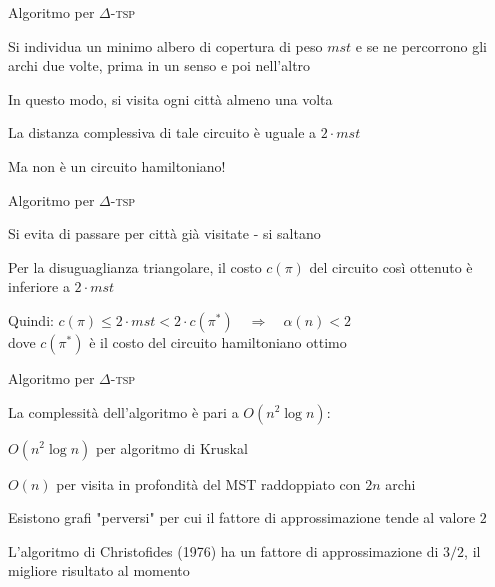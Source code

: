 \begin{frame}{Algoritmo per $\Delta$-\textsc{tsp}}

\vspace{-9pt}
\BIL
\item Si individua un minimo albero di copertura di peso $\mathit{mst}$ e se ne percorrono gli archi due volte, prima in un senso e poi nell'altro 
\item In questo modo, si visita ogni città almeno una volta
\item La distanza complessiva di tale circuito è uguale a $2 \cdot \mathit{mst}$
\item Ma non è un circuito hamiltoniano!
\EIL

\vspace{-12pt}

\end{frame}

\begin{frame}{Algoritmo per $\Delta$-\textsc{tsp}}

\vspace{-9pt}
\BIL
\item Si evita di passare per città già visitate - si saltano
\item Per la disuguaglianza triangolare, il costo $c(\pi)$ del circuito così
ottenuto è inferiore a $2 \cdot \mathit{mst}$
\item Quindi:
$
  c(\pi) \leq 2 \cdot \mathit{mst} < 2 \cdot c(\pi^*) \quad \Rightarrow \quad \alpha(n) < 2
$\\
dove $c(\pi^*)$ è il costo del circuito hamiltoniano ottimo
\EIL

\vspace{-12pt}

\end{frame}

\begin{frame}{Algoritmo per $\Delta$-\textsc{tsp}}

\BIL
\item La complessità dell'algoritmo è pari a $O(n^2 \log n)$:
  \BI
  \item $O(n^2 \log n)$ per algoritmo di Kruskal
  \item $O(n)$ per visita in profondità del MST raddoppiato con $2n$ archi
  \EI
\item Esistono grafi "perversi" per cui il fattore di approssimazione tende
al valore $2$
\item L'algoritmo di Christofides (1976) ha un fattore di approssimazione
di $3/2$, il migliore risultato al momento
\EIL
  
\end{frame}

